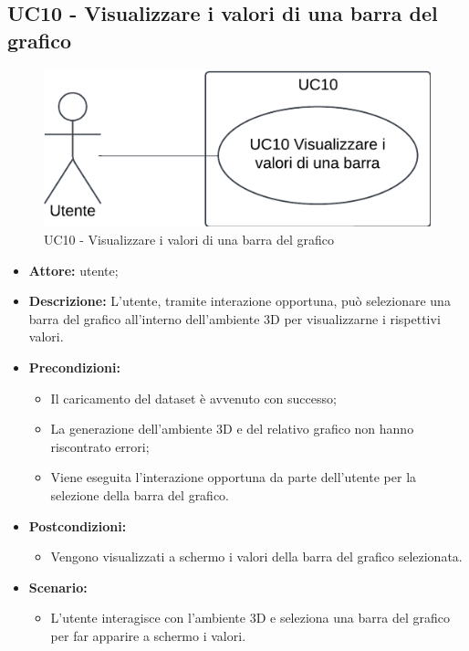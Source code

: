 \subsection{UC10 - Visualizzare i valori di una barra del grafico}
\begin{figure}[h!]\centering
    \includegraphics[scale=0.7]{template/images/UC10.png}
    \caption{UC10 - Visualizzare i valori di una barra del grafico}
\end{figure}
\begin{itemize}    
    \item \textbf{Attore:} utente;
    \item \textbf{Descrizione:} L'utente, tramite interazione opportuna, può selezionare una barra del grafico all'interno dell'ambiente 3D per visualizzarne i rispettivi valori.
    \item \textbf{Precondizioni:}    
        \begin{itemize}
            \item Il caricamento del dataset è avvenuto con successo;
            \item La generazione dell'ambiente 3D e del relativo grafico non hanno riscontrato errori;
            \item Viene eseguita l'interazione opportuna da parte dell'utente per la selezione della barra del grafico.
        \end{itemize}    
    \item \textbf{Postcondizioni:}
        \begin{itemize}
            \item Vengono visualizzati a schermo i valori della barra del grafico selezionata.
        \end{itemize}    
    \item \textbf{Scenario:} 
        \begin{itemize}
            \item L'utente interagisce con l'ambiente 3D e seleziona una barra del grafico per far apparire a schermo i valori.
        \end{itemize}
\end{itemize}

